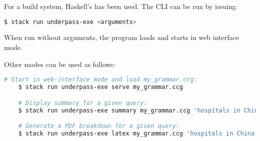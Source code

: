 \documentclass[main.tex]{subfiles}
\begin{document}

For a build system, Haskell's  has been used. The
CLI can be run by issuing:
\begin{lstwrap}\begin{lstlisting}[language=bash]
    $ stack run underpass-exe <arguments>
\end{lstlisting}\end{lstwrap}

When run without arguments, the program loads 
and starts in web interface mode.

Other modes can be used as follows:
\begin{lstwrap}\begin{lstlisting}[language=bash]
    # Start in web-interface mode and load my_grammar.ccg:
    $ stack run underpass-exe serve my_grammar.ccg

    # Display summary for a given query:
    $ stack run underpass-exe summary my_grammar.ccg 'hospitals in China'

    # Generate a PDF breakdown for a given query:
    $ stack run underpass-exe latex my_grammar.ccg 'hospitals in China'
\end{lstlisting}\end{lstwrap}

\end{document}
